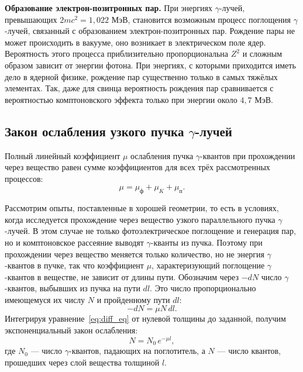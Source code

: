 \documentclass[12pt,a4paper]{article}
\begin{document}
\textbf{Образование электрон-позитронных пар.} При энергиях $\gamma$-лучей, превышающих $2mc^2 = 1{,}022$ МэВ, становится возможным процесс поглощения $\gamma$-лучей, связанный с образованием электрон-позитронных пар. Рождение пары не может происходить в вакууме, оно возникает в электрическом поле ядер. Вероятность этого процесса приблизительно пропорциональна $Z^2$ и сложным образом зависит от энергии фотона. При энергиях, с которыми приходится иметь дело в ядерной физике, рождение пар существенно только в самых тяжёлых элементах. Так, даже для свинца вероятность рождения пар сравнивается с вероятностью комптоновского эффекта только при энергии около $4{,}7$ МэВ.

\subsection*{Закон ослабления узкого пучка $\gamma$-лучей}

Полный линейный коэффициент $\mu$ ослабления пучка $\gamma$-квантов при прохождении через вещество равен сумме коэффициентов для всех трёх рассмотренных процессов:
\begin{equation}
    \mu = \mu_\text{ф} + \mu_K + \mu_\text{п}.
    \label{eq:mu_total}
\end{equation}

Рассмотрим опыты, поставленные в хорошей геометрии, то есть в условиях, когда исследуется прохождение через вещество узкого параллельного пучка $\gamma$-лучей. В этом случае не только фотоэлектрическое поглощение и генерация пар, но и комптоновское рассеяние выводят $\gamma$-кванты из пучка. Поэтому при прохождении через вещество меняется только количество, но не энергия $\gamma$-квантов в пучке, так что коэффициент $\mu$, характеризующий поглощение $\gamma$-квантов в веществе, не зависит от длины пути. Обозначим через $-dN$ число $\gamma$-квантов, выбывших из пучка на пути $dl$. Это число пропорционально имеющемуся их числу $N$ и пройденному пути $dl$:
\begin{equation}
    -dN = \mu N \, dl.
    \label{eq:diff_eq}
\end{equation}
Интегрируя уравнение~\eqref{eq:diff_eq} от нулевой толщины до заданной, получим экспоненциальный закон ослабления:
\begin{equation}
    N = N_0 \, e^{-\mu l},
    \label{eq:attenuation}
\end{equation}
где $N_0$ --- число $\gamma$-квантов, падающих на поглотитель, а $N$ --- число квантов, прошедших через слой вещества толщиной $l$.
\end{document}
